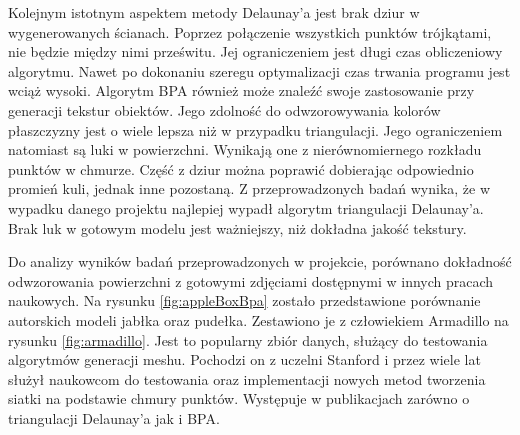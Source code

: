 Kolejnym istotnym aspektem metody Delaunay'a jest brak dziur w wygenerowanych ścianach. Poprzez połączenie wszystkich punktów trójkątami, nie będzie między nimi prześwitu. Jej ograniczeniem jest długi czas obliczeniowy algorytmu. Nawet po dokonaniu szeregu optymalizacji czas trwania programu jest wciąż wysoki. 
\newline \indent Algorytm BPA również może znaleźć swoje zastosowanie przy generacji tekstur obiektów. Jego zdolność do odwzorowywania kolorów płaszczyzny jest o wiele lepsza niż w przypadku triangulacji. Jego ograniczeniem natomiast są luki w powierzchni. Wynikają one z nierównomiernego rozkładu punktów w chmurze. Część z dziur można poprawić dobierając odpowiednio promień kuli, jednak inne pozostaną. Z przeprowadzonych badań wynika, że w wypadku danego projektu najlepiej wypadł algorytm triangulacji Delaunay'a. Brak luk w gotowym modelu jest ważniejszy, niż dokładna jakość tekstury. 

Do analizy wyników badań przeprowadzonych w projekcie, porównano dokładność odwzorowania powierzchni z gotowymi zdjęciami dostępnymi w innych pracach naukowych. Na rysunku \ref{fig:appleBoxBpa} zostało przedstawione porównanie autorskich modeli jabłka oraz pudełka. Zestawiono je z człowiekiem Armadillo na rysunku \ref{fig:armadillo}. Jest to popularny zbiór danych, służący do testowania algorytmów generacji meshu. Pochodzi on z uczelni Stanford i przez wiele lat służył naukowcom do testowania oraz implementacji nowych metod tworzenia siatki na podstawie chmury punktów. Występuje w publikacjach zarówno o triangulacji Delaunay'a jak i BPA.  

